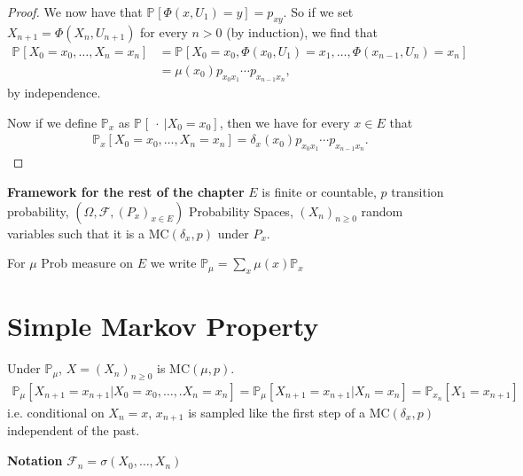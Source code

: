 \begin{proof}
{We now have that $\mathbb{P}_{} \left[\Phi(x,U_1) = y  \right] = p_{xy}$. So if we set $X_{n+1} = \Phi(X_n, U_{n+1})$ for every $n>0$ (by induction), we find that
\begin{align}
	\mathbb{P}_{} \left[ X_0=x_0, \ldots ,X_n=x_n \right] &=
		\mathbb{P}_{} \left[ X_0=x_0, \Phi(x_0, U_1)=x_1 , \ldots , \Phi(x_{n-1}, U_{n}) = x_n \right] \\
	&= \mu(x_0)p_{x_0x_1} \cdots p_{x_{n-1}x_n}
,\end{align}
by independence.

Now if we define $\mathbb{P}_{x} $ as $\mathbb{P}_{} \left[\ \cdot\ | X_0 = x_0 \right] $, then we have for every $x \in E$ that
\begin{align}
	\mathbb{P}_{x} \left[ X_0=x_0, \ldots ,X_n=x_n \right] = \delta_x(x_0)p_{x_0x_1} \cdots p_{x_{n-1}x_n}
.\end{align}
}
\end{proof}

\noindent
\textbf{Framework for the rest of the chapter} 
$E$ is finite or countable, $p$ transition probability, $(\Omega, \mathcal{F}, (P_x)_{x \in E})$ Probability Spaces, $(X_n)_{n \geq 0}$ random variables such that it is a  $ \textrm{MC}(\delta_x, p)$ under $P_x$.

For $\mu$ Prob measure on $E $ we write $\mathbb{P}_\mu = \sum_{x}\mu(x)\mathbb{P}_{x}$

\section{Simple Markov Property}
\begin{rmk}[]
Under $\mathbb{P}_\mu$, $X=(X_n)_{n \geq 0}$ is $ \textrm{MC}(\mu, p)$.
\begin{align}
	\mathbb{P}_\mu [X_{n+1}=x_{n+1} | X_0 = x_0, \ldots ,.X_n=x_n] = \mathbb{P}_\mu[X_{n+1}=x_{n+1}| X_n = x_n] = \mathbb{P}_{x_n}[X_1 =x_{n+1}]
\end{align}
i.e. conditional on $X_n=x$, $x_{n+1}$ is sampled like the first step of a $ \textrm{MC}(\delta_{x},p)$ independent of the past.
\end{rmk}
\textbf{Notation} $ \mathcal{F}_n = \sigma(X_0, \ldots ,X_n)$ 

